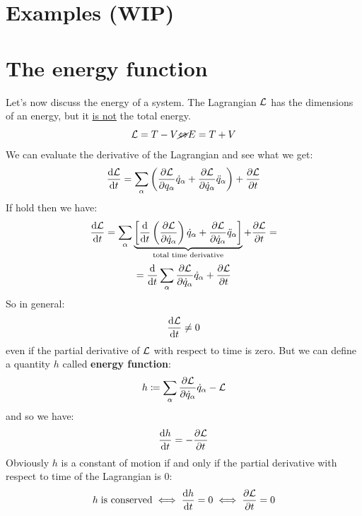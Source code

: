\section{Examples (WIP)}
\section{The energy function}
Let's now discuss the energy of a system. The Lagrangian $\mathcal{L}$ has the dimensions of an energy, but it \underline{is not} the total energy.
\begin{equation}
    \mathcal{L} = T - V \cancel{\Leftrightarrow} E = T + V
\end{equation}
We can evaluate the derivative of the Lagrangian and see what we get:
\begin{equation}
    \dfrac{\dd{\lagr}}{\dd{t}} = \bigsum_{\alpha}\brackets{\pdv{\lagr}{q_{\alpha}}\dot{q}_{\alpha} + \pdv{\lagr}{\dot{q}_{\alpha}}\ddot{q}_{\alpha}} + \dfrac{\partial \lagr}{\partial t}
\end{equation}
If \eleref\;hold then we have:
\begin{equation}
    \dfrac{\dd{\lagr}}{\dd{t}} = \bigsum_{\alpha}\underbrace{\sqbr{\dv{}{t}\brackets{\pdv{\lagr}{\dot{q}_{\alpha}}}\dot{q}_{\alpha} + \pdv{\lagr}{\dot{q}_{\alpha}}\ddot{q}_{\alpha}}}_{\text{total time derivative}} + \dfrac{\partial \lagr}{\partial t} =
\end{equation}
\begin{equation}
 = \dv{}{t}\bigsum_{\alpha}\pdv{\lagr}{\dot{q}_{\alpha}}\dot{q}_{\alpha} + \dfrac{\partial \lagr}{\partial t}
\end{equation}
So in general:
\begin{equation}
    \dfrac{\dd{\mathcal{L}}}{\dd{t}} \neq 0
\end{equation}
even if the partial derivative of $\mathcal{L}$ with respect to time is zero. But we can define a quantity $h$ called \textbf{energy function}:
\begin{equation}
    h \defineeq \bigsum_{\alpha}\pdv{\lagr}{\dot{q}_{\alpha}}\dot{q}_{\alpha} - \lagr
\end{equation}
and so we have:
\begin{equation}
    \dfrac{\dd{h}}{\dd{t}} = -\dfrac{\partial \mathcal{L}}{\partial t}
\end{equation}
Obviously $h$ is a constant of motion if and only if the partial derivative with respect to time of the Lagrangian is 0:
\begin{equation}
    h\;\text{is conserved} \iff \dfrac{\dd{h}}{\dd{t}} = 0 \iff \dfrac{\partial \mathcal{L}}{\partial t} = 0
\end{equation}
